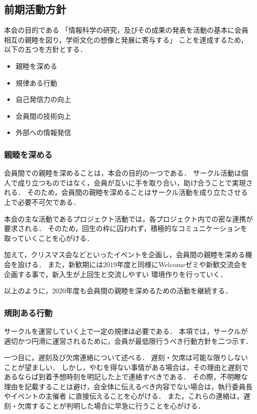 \subsection*{前期活動方針}


本会の目的である
「情報科学の研究，及びその成果の発表を活動の基本に会員相互の親睦を図り，学術文化の想像と発展に寄与する」
ことを達成するため，以下の五つを方針とする．

\begin{itemize}
  \item 親睦を深める
  \item 規律ある行動
  \item 自己発信力の向上
  \item 会員間の技術向上
  \item 外部への情報発信
\end{itemize}

\subsubsection*{親睦を深める}
  会員間での親睦を深めることは，本会の目的の一つである．
  サークル活動は個人で成り立つものではなく，会員が互いに手を取り合い，助け合うことで実現される．
  そのため，会員間の親睦を深めることはサークル活動を成り立たさせる上で必要不可欠である．

  本会の主な活動であるプロジェクト活動では，各プロジェクト内での密な連携が要求される．
  そのため，回生の枠に囚われず，積極的なコミュニケーションを取っていくことを心がける．

  加えて，クリスマス会などといったイベントを企画し，会員間の親睦を深める機会を設ける．
  また，新歓期には2019年度と同様にWelcomeゼミや新歓交流会を企画する事で，新入生が上回生と交流しやすい
  環境作りを行っていく．

  以上のように，2020年度も会員間の親睦を深めるための活動を継続する．

\subsubsection*{規則ある行動}
  サークルを運営していく上で一定の規律は必要である．
  本項では，サークルが適切かつ円滑に運営されるために，会員が最低限行うべき行動方針を二つ示す．

  一つ目に，遅刻及び欠席連絡について述べる．
  遅刻・欠席は可能な限りしないことが望ましい．
  しかし，やむを得ない事情がある場合は，その理由と遅刻であるならば到着予想時刻を明記した上で連絡すべきである．
  その際，不明瞭な理由を記載することは避け，会全体に伝えるべき内容でない場合は，執行委員長やイベントの主催者
  に直接伝えることを心がける．
  また，これらの連絡は，遅刻・欠席することが判明した場合に早急に行うことを心がける．

